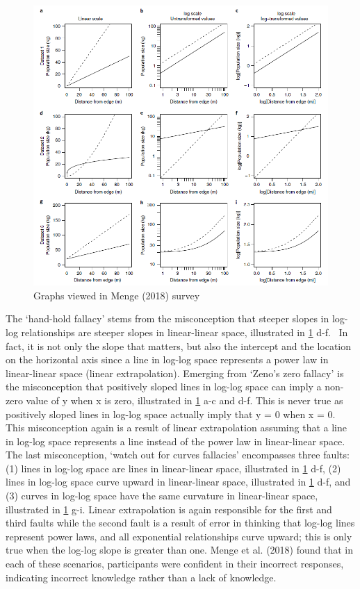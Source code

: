 \documentclass[print]{nuthesis}
\begin{document}
\begin{figure}[tbp]

{\centering \includegraphics[width=1\linewidth,]{images/menge-plots} 

}

\caption{Graphs viewed in Menge (2018) survey}\label{fig:menge-plots}
\end{figure}

The `hand-hold fallacy' stems from the misconception that steeper slopes in log-log relationships are steeper slopes in linear-linear space, illustrated in \cref{fig:menge-plots} d-f.~
In fact, it is not only the slope that matters, but also the intercept and the location on the horizontal axis since a line in log-log space represents a power law in linear-linear space (linear extrapolation).
Emerging from `Zeno's zero fallacy' is the misconception that positively sloped lines in log-log space can imply a non-zero value of y when x is zero, illustrated in \cref{fig:menge-plots} a-c and d-f.
This is never true as positively sloped lines in log-log space actually imply that y = 0 when x = 0. This misconception again is a result of linear extrapolation assuming that a line in log-log space represents a line instead of the power law in linear-linear space.
The last misconception, `watch out for curves fallacies' encompasses three faults: (1) lines in log-log space are lines in linear-linear space, illustrated in \cref{fig:menge-plots} d-f, (2) lines in log-log space curve upward in linear-linear space, illustrated in \cref{fig:menge-plots} d-f, and (3) curves in log-log space have the same curvature in linear-linear space, illustrated in \cref{fig:menge-plots} g-i.
Linear extrapolation is again responsible for the first and third faults while the second fault is a result of error in thinking that log-log lines represent power laws, and all exponential relationships curve upward; this is only true when the log-log slope is greater than one.
Menge et al. (2018) found that in each of these scenarios, participants were confident in their incorrect responses, indicating incorrect knowledge rather than a lack of knowledge.
\end{document}
